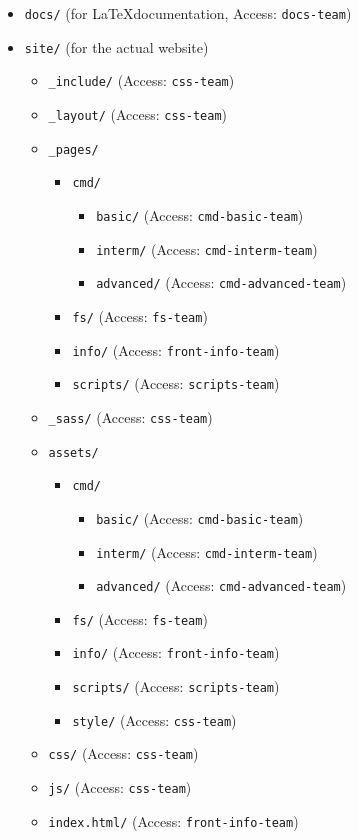 \documentclass[hidelinks,12pt,a4paper,numbers=enddot]{scrartcl}
\begin{document}
\begin{itemize}
\item \texttt{docs/} (for \LaTeX documentation, Access: \texttt{docs-team})
\item \texttt{site/} (for the actual website)
	\begin{itemize}
	\item \texttt{\_include/} (Access: \texttt{css-team})
	\item \texttt{\_layout/} (Access: \texttt{css-team})
	\item \texttt{\_pages/}
		\begin{itemize}
            \item \texttt{cmd/}
			\begin{itemize}
			\item \texttt{basic/} (Access: \texttt{cmd-basic-team})
			\item \texttt{interm/} (Access: \texttt{cmd-interm-team})
			\item \texttt{advanced/} (Access: \texttt{cmd-advanced-team})
			\end{itemize}
		\item \texttt{fs/} (Access: \texttt{fs-team})
		\item \texttt{info/} (Access: \texttt{front-info-team})
		\item \texttt{scripts/} (Access: \texttt{scripts-team})
		\end{itemize}
	\item \texttt{\_sass/} (Access: \texttt{css-team})
	\item \texttt{assets/}
		\begin{itemize}
		\item \texttt{cmd/}
			\begin{itemize}
			\item \texttt{basic/} (Access: \texttt{cmd-basic-team})
			\item \texttt{interm/} (Access: \texttt{cmd-interm-team})
			\item \texttt{advanced/} (Access: \texttt{cmd-advanced-team})
			\end{itemize}
		\item \texttt{fs/} (Access: \texttt{fs-team})
		\item \texttt{info/} (Access: \texttt{front-info-team})
		\item \texttt{scripts/} (Access: \texttt{scripts-team})
		\item \texttt{style/} (Access: \texttt{css-team})
		\end{itemize}
	\item \texttt{css/} (Access: \texttt{css-team})
	\item \texttt{js/} (Access: \texttt{css-team})
	\item \texttt{index.html/} (Access: \texttt{front-info-team})
	\end{itemize}
\end{itemize}
\end{document}

